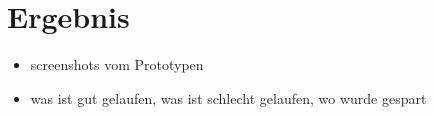 \chapter{Ergebnis}
\label{cha:ergebnis}
\begin{itemize}
	\item screenshots vom Prototypen
	\item was ist gut gelaufen, was ist schlecht gelaufen, wo wurde gespart
\end{itemize}